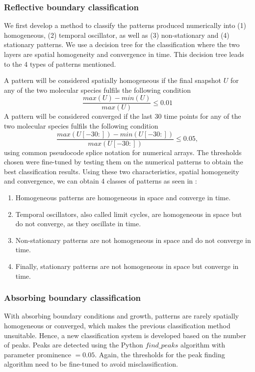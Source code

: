 \documentclass[10pt,letterpaper]{article}
\begin{document}
\subsubsection*{Reflective boundary classification}\label{numerical_classification1}
We first develop a method to classify the patterns produced numerically into (1) homogeneous, (2) temporal oscillator, as well as (3) non-stationary and (4) stationary patterns.
We use a decision tree for the classification where the two layers are spatial homogeneity and convergence in time.
This decision tree leads to the 4 types of patterns mentioned.

A pattern will be considered spatially homogeneous if the final snapshot $U$ for any of the two molecular species fulfils the following condition
\begin{equation}
    \frac{max(U) - min(U)}{max(U)} \leq 0.01
\end{equation}
A pattern will be considered converged if the last 30 time points for any of the two molecular species fulfils the following condition
\begin{equation}
    \frac{max(U[-30:]) - min(U[-30:])}{max(U[-30:])} \leq 0.05,
\end{equation}
using common pseudocode splice notation for numerical arrays. The thresholds chosen were fine-tuned by testing them on the numerical patterns to obtain the best classification results.
Using these two characteristics, spatial homogeneity and convergence, we can obtain 4 classes of patterns as seen in :
\begin{enumerate}
    \item Homogeneous patterns are homogeneous in space and converge in time.
    \item Temporal oscillators, also called limit cycles, are homogeneous in space but do not converge, as they oscillate in time.
    \item Non-stationary patterns are not homogeneous in space and do not converge in time.
    \item Finally, stationary patterns are not homogeneous in space but converge in time.
\end{enumerate}

\subsubsection*{Absorbing boundary classification}\label{numerical_classification2}
With absorbing boundary conditions and growth, patterns are rarely spatially homogeneous or converged, which makes the previous classification method unsuitable. Hence, a new classification system is developed based on the number of peaks.
Peaks are detected using the Python $find\_peaks$ algorithm with parameter prominence $=0.05$.
Again, the thresholds for the peak finding algorithm need to be fine-tuned to avoid misclassification.
\end{document}
